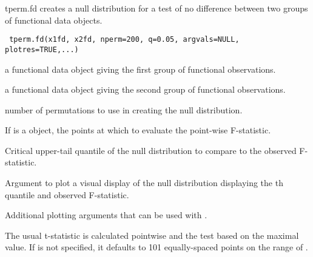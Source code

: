 \documentclass{article}
\begin{document}
\begin{Description}\relax
tperm.fd creates a null distribution for a test of no difference between two
groups of functional data objects.
\end{Description}
\begin{Usage}
\begin{verbatim}
 tperm.fd(x1fd, x2fd, nperm=200, q=0.05, argvals=NULL, plotres=TRUE,...)
\end{verbatim}
\end{Usage}
\begin{Arguments}
\begin{ldescription}
\item[\code{x1fd}] a functional data object giving the first group of functional observations.

\item[\code{x2fd}] a functional data object giving the second group of functional
observations.

\item[\code{nperm}] number of permutations to use in creating the null distribution.

\item[\code{argvals}] If  is a  object, the points at which to evaluate
the point-wise F-statistic.

\item[\code{q}] Critical upper-tail quantile of the null distribution to compare to the observed F-statistic.

\item[\code{plotres}] Argument to plot a visual display of the null distribution displaying the
th quantile and observed F-statistic.

\item[\code{...}] Additional plotting arguments that can be used with .

\end{ldescription}
\end{Arguments}
\begin{Details}\relax
The usual t-statistic is calculated pointwise and the test based on the
maximal value. If  is not specified,
it defaults to 101 equally-spaced points on the range of .
\end{Details}
\end{document}
